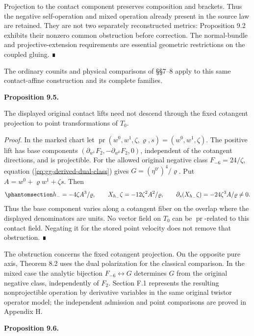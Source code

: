 \documentclass[
  english,
  11pt,
  reqno]{amsart}
\makeatletter
\newcommand{\pandocstatementheading}[1]{%
  \par\addpenalty{\@beginparpenalty}%
  \addvspace{.5\baselineskip plus .2\baselineskip minus .2\baselineskip}%
  {\normalfont\bfseries #1\par}%
  \nobreak\@afterindenttrue\@afterheading
}
\makeatother
\begin{document}
Projection to the contact component preserves composition and brackets.
Thus the negative self-operation and mixed operation already present in
the source law are retained. They are not two separately reconstructed
metrics: Proposition 9.2 exhibits their nonzero common obstruction
before correction. The normal-bundle and projective-extension
requirements are essential geometric restrictions on the coupled gluing.
∎

The ordinary counits and physical comparisons of §§7--8 apply to this
same contact-affine construction and its complete families.

\pandocstatementheading{\protect{}\label{prop:gg-fixed-source-projection-obstruction}Proposition 9.5.}

The displayed original contact lifts need not descend through the fixed
cotangent projection to point transformations of \(T_0\).

\emph{Proof.} In the marked chart let
\(\operatorname{pr}(w^0,w^1,\zeta,\varrho,s)=(w^0,w^1,\zeta)\). The
positive lift has base components
\((\partial_{w^1}F_2,-\partial_{w^0}F_2,0)\), independent of the
cotangent directions, and is projectible. For the allowed original
negative class \(F_{-6}=24/\zeta\), equation
(\ref{eq:gg-derived-dual-class}) gives \(G=(\eta^{0'})^4/\varrho\). Put
\(A=w^0+\varrho w^1+\zeta s\). Then
\begin{equation}\protect\phantomsection\label{eq:gg-fixed-source-projection-obstruction}{
 h_-=-4\zeta A^3/\varrho,\qquad
 X_{h_-}\zeta=-12\zeta^2A^2/\varrho,\qquad
 \partial_s(X_{h_-}\zeta)=-24\zeta^3A/\varrho\ne0 .
}\end{equation} Thus the base component varies along a cotangent fiber
on the overlap where the displayed denominators are units. No vector
field on \(T_0\) can be \(\operatorname{pr}\)-related to this contact
field. Negating it for the stored point velocity does not remove that
obstruction. ∎

The obstruction concerns the fixed cotangent projection. On the opposite
pure axis, Theorem 8.2 uses the dual polarization for the classical
comparison. In the mixed case the analytic bijection
\(F_{-6}\leftrightarrow G\) determines \(G\) from the original negative
class, independently of \(F_2\). Section F.1 represents the resulting
nonprojectible operation by derivative variables in the same original
twistor operator model; the independent admission and point comparisons
are proved in Appendix H.

\pandocstatementheading{\protect{}\label{prop:gg-finite-source-operator-realization}Proposition 9.6.}
\end{document}
